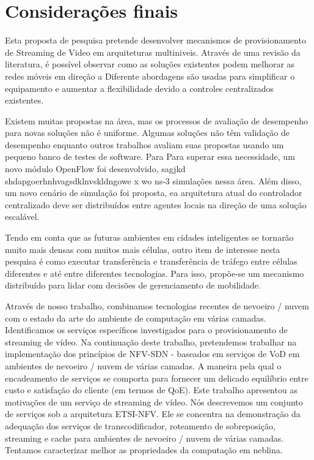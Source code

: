 \clearpage
\section{Considerações finais}
\label{ch:remarks}

Esta proposta de pesquisa pretende desenvolver mecanismos de provisionamento de Streaming de Video em 
arquiteturas multiniveis. Através de uma revisão da literatura, é possível observar como as soluções existentes podem melhorar as redes móveis em direção a
Diferente abordagens são usadas para simplificar o equipamento e aumentar a flexibilidade devido a controles centralizados existentes.

Existem muitas propostas na área, mas os processos de avaliação de desempenho
para novas soluções não é uniforme. Algumas soluções não têm validação de desempenho
enquanto outros trabalhos avaliam suas propostas usando um pequeno banco de testes de software. Para
Para superar essa necessidade, um novo módulo OpenFlow foi desenvolvido, sagjkd shdapgoerhnhvagsdklnvskldngowe x wo ns-3
simulações nessa área. Além disso, um novo cenário de simulação foi
proposta, ea arquitetura atual do controlador centralizado deve ser
distribuídos entre agentes locais na direção de uma solução escalável.

Tendo em conta que as futuras ambientes em cidades inteligentes se tornarão muito mais densas com muitos
mais células, outro item de interesse nesta pesquisa é como executar
transferência e transferência de tráfego entre células diferentes e até entre
diferentes tecnologias. Para isso, propõe-se um mecanismo distribuído para
lidar com decisões de gerenciamento de mobilidade.


Através de nosso trabalho, combinamos tecnologias recentes de nevoeiro / nuvem com o estado da arte do ambiente de computação em várias camadas. Identificamos os serviços específicos investigados para o provisionamento de streaming de vídeo. Na continuação deste trabalho, pretendemos trabalhar na implementação dos princípios de NFV-SDN - baseados em serviços de VoD em ambientes de nevoeiro / nuvem de várias camadas. A maneira pela qual o encadeamento de serviços se comporta para fornecer um delicado equilíbrio entre custo e satisfação do cliente (em termos de QoE). Este trabalho apresentou as motivações de um serviço de streaming de vídeo. Nós descrevemos um conjunto de serviços sob a arquitetura ETSI-NFV. Ele se concentra na demonstração da adequação dos serviços de transcodificador, roteamento de sobreposição, streaming e cache para ambientes de nevoeiro / nuvem de várias camadas. Tentamos caracterizar melhor as propriedades da computação em neblina.